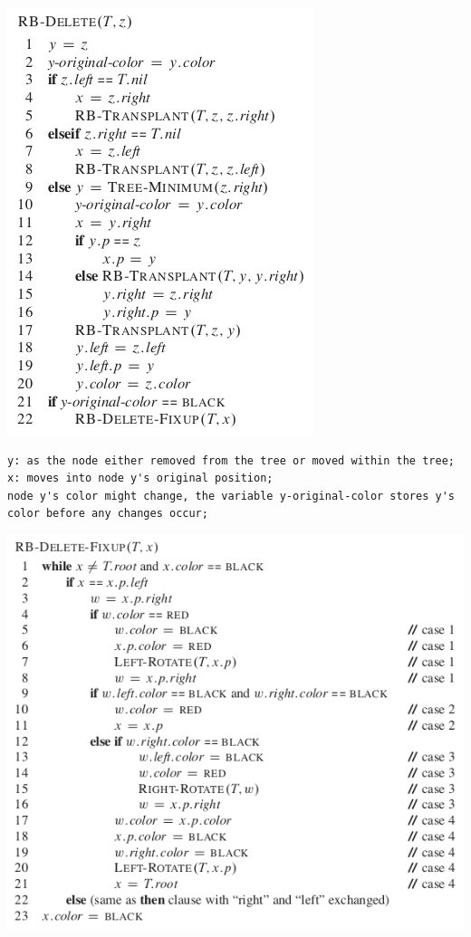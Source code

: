 \documentclass[11pt]{article}
\begin{document}
\includegraphics[width=.9\linewidth]{pics/c13_rb_delete.png} \\

\begin{verbatim}
y: as the node either removed from the tree or moved within the tree;
x: moves into node y's original position;
node y's color might change, the variable y-original-color stores y's color before any changes occur;
\end{verbatim}

\includegraphics[width=.9\linewidth]{pics/c13_rb_delete_fixup.png} \\
\end{document}
